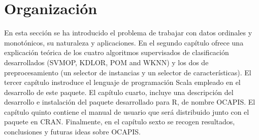 \section{Organización}
En esta sección se ha introducido el problema de trabajar con datos ordinales y monotónicos, su naturaleza y aplicaciones. En el segundo capítulo ofrece una explicación teórica de  los cuatro algoritmos supervisados de clasificación desarrollados (SVMOP, KDLOR, POM and WKNN) y los dos de preprocesamiento (un  selector de instancias y un selector de características). El tercer capítulo instroduce el lenguaje de programación Scala empleado en el desarrollo de este paquete. El capítulo cuarto, incluye una descripción del desarrollo e instalación del paquete desarrollado para R, de nombre OCAPIS. El capítulo quinto contiene el manual de usuario que será distribuido junto con el paquete en CRAN. Finalmente, en el capítulo sexto se recogen resultados, conclusiones y futuras ideas sobre OCAPIS.
